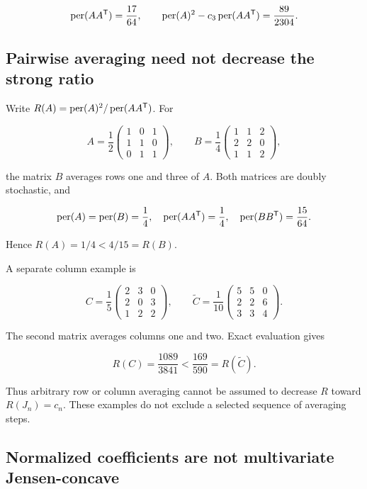 \[
\operatorname{per}(AA^{\mathsf{T}})=\frac{17}{64},\qquad
\operatorname{per}(A)^2-c_3\operatorname{per}(AA^{\mathsf{T}})=\frac{89}{2304}.
\]

\subsection{Pairwise averaging need not decrease the strong ratio}\label{app:additional-3}

Write \(R(A)=\operatorname{per}(A)^2/\operatorname{per}(AA^{\mathsf{T}})\). For

\[
A=\frac12\begin{pmatrix}1&0&1\\1&1&0\\0&1&1\end{pmatrix},\qquad
B=\frac14\begin{pmatrix}1&1&2\\2&2&0\\1&1&2\end{pmatrix},
\]

the matrix \(B\) averages rows one and three of \(A\). Both matrices are doubly stochastic, and

\[
\operatorname{per}(A)=\operatorname{per}(B)=\frac14,
\quad\operatorname{per}(AA^{\mathsf{T}})=\frac14,
\quad\operatorname{per}(BB^{\mathsf{T}})=\frac{15}{64}.
\]

Hence \(R(A)=1/4<4/15=R(B)\).

A separate column example is

\[
C=\frac15\begin{pmatrix}2&3&0\\2&0&3\\1&2&2\end{pmatrix},\qquad
\widetilde C=\frac1{10}\begin{pmatrix}5&5&0\\2&2&6\\3&3&4\end{pmatrix}.
\]

The second matrix averages columns one and two. Exact evaluation gives

\[
R(C)=\frac{1089}{3841}<\frac{169}{590}=R(\widetilde C).
\]

Thus arbitrary row or column averaging cannot be assumed to decrease \(R\) toward \(R(J_n)=c_n\). These examples do not exclude a selected sequence of averaging steps.

\subsection{Normalized coefficients are not multivariate Jensen-concave}\label{app:additional-4}

